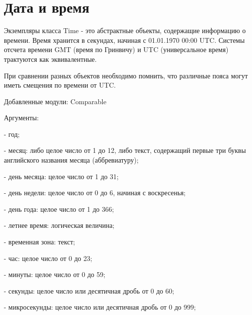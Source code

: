 \chapter{Дата и время}

Экземпляры класса Time - это абстрактные объекты, содержащие информацию о времени. Время хранится в секундах, начиная с 01.01.1970 00:00 UTC. Системы отсчета времени GMT (время по Гринвичу) и UTC (универсальное время) трактуются как эквивалентные.

При сравнении разных объектов необходимо помнить, что различные пояса могут иметь смещения по времени от UTC.

Добавленные модули: Comparable

\begin{keylist}{Аргументы:}
  
   - год; 
  
   - месяц: либо целое число от 1 до 12, либо текст, содержащий первые три буквы английского названия месяца (аббревиатуру); 
  
   - день месяца: целое число от 1 до 31; 
  
   - день недели: целое число от 0 до 6, начиная с воскресенья; 
  
   - день года: целое число от 1 до 366; 
  
   - летнее время: логическая величина; 
  
   - временная зона: текст; 
  
   - час: целое число от 0 до 23; 
  
   - минуты: целое число от 0 до 59; 
  
   - секунды: целое число или десятичная дробь от 0 до 60; 
  
   - микросекунды: целое число или десятичная дробь от 0 до 999;
\end{keylist}

